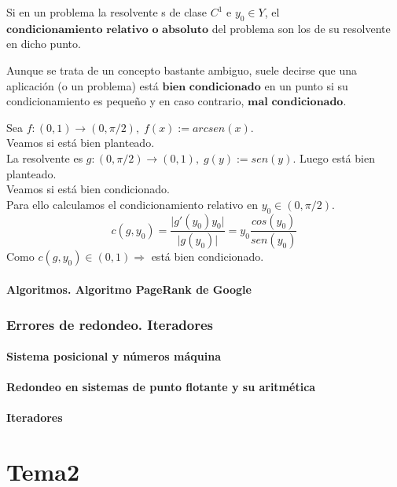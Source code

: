 \begin{ndef}
Si en un problema la resolvente s de clase $C^1$ e $y_0 \in Y$, el $\textbf{condicionamiento relativo o absoluto}$ del problema son los de su resolvente en dicho punto.
\end{ndef}

\begin{nota}
Aunque se trata de un concepto bastante ambiguo, suele decirse que una aplicación (o un problema) está $\textbf{bien condicionado}$ en un punto si su condicionamiento es pequeño y en caso contrario, $\textbf{mal condicionado}$.
\end{nota}

\begin{ejemplo}
Sea $f : (0,1) \rightarrow (0, \pi / 2), \; f(x) := arcsen(x)$.\\
Veamos si está bien planteado.\\
La resolvente es $g : (0, \pi / 2) \rightarrow (0,1), \; g(y) := sen(y)$. Luego está bien planteado.\\
Veamos si está bien condicionado.\\ Para ello calculamos el condicionamiento relativo en $y_0 \in (0, \pi / 2)$.\\
\[ c(g,y_0) = \frac{\vert g'(y_0)y_0 \vert }{\vert g(y_0) \vert} = y_0 \frac{cos(y_0)}{sen(y_0)} \]
Como $c(g,y_0) \in (0,1) \Rightarrow$ está bien condicionado.
\end{ejemplo}


\subsection{Algoritmos. Algoritmo PageRank de Google}


\section{Errores de redondeo. Iteradores}


\subsection{Sistema posicional y números máquina}


\subsection{Redondeo en sistemas de punto flotante y su aritmética}


\subsection{Iteradores}


\part{Tema2}



